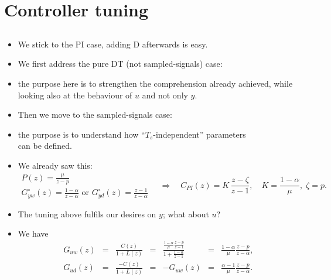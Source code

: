 \section{Controller tuning}
\subsection{}

\begin{frame}
\framesubtitleTC{}
\myPause
 \begin{itemize}[<+-| alert@+>]
 \item We stick to the PI case, adding D afterwards is easy.
 \item We first address the pure DT (not sampled-signals) case: %
 \item the purpose here is to strengthen the comprehension already achieved, while looking also at the behaviour of $u$ and not only $y$.
 \item Then we move to the sampled-signals case:
 \item the purpose is to understand how ``$T_s$-independent'' parameters\\
       can be defined.
 \end{itemize}
\end{frame}

\begin{frame}
\myPause
 \begin{itemize}[<+-| alert@+>]
 \item We already saw this:
       \begin{displaymath}
        \begin{array}{l}
          P(z)              = \frac{\mu}{z-p} \\
          G_{yw}^{\circ}(z) = \frac{1-\alpha}{z-\alpha}
          \text{ or }
          G_{yd}^{\circ}(z) = \frac{z-1}{z-\alpha}       
        \end{array}
        \quad \Rightarrow \quad
        C_{PI}(z) = K\,\frac{z-\zeta}{z-1}, \quad
        K         = \frac{1-\alpha}{\mu}, \;
        \zeta     = p.
       \end{displaymath}
 \item The tuning above fulfils our desires on $y$; what about $u$?
 \item We have
       \begin{displaymath}
        \begin{array}{rclclcl}
         G_{uw}(z) &=& \frac{C(z)}{1+L(z)}
                   &=& \frac{\frac{1-\alpha}{\mu}\frac{z-p}{z-1}}{1+\frac{1-\alpha}{z-1}}
                   &=& \frac{1-\alpha}{\mu}\frac{z-p}{z-\alpha}, \\
         G_{ud}(z) &=& \frac{-C(z)}{1+L(z)}
                   &=& -G_{uw}(z)
                   &=& \frac{\alpha-1}{\mu}\frac{z-p}{z-\alpha}. \\
        \end{array}
       \end{displaymath}
 \end{itemize}
\end{frame}

